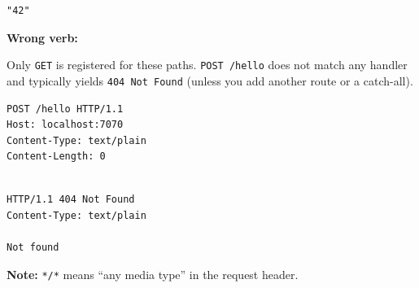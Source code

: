 \begin{solutionorbox}[1.00in]
\begin{httpexchange}
\begin{lstlisting}[style=http]
"42"
\end{lstlisting}
  \end{httpexchange}

  \noindent\textbf{Wrong verb:}\par
  \noindent Only \texttt{GET} is registered for these paths. \texttt{POST /hello} does not match any handler and typically yields \texttt{404 Not Found} (unless you add another route or a catch-all).\par
  \begin{httpexchange}
\begin{lstlisting}[style=http]
POST /hello HTTP/1.1
Host: localhost:7070
Content-Type: text/plain
Content-Length: 0


\end{lstlisting}
\httpmidarrows
\begin{lstlisting}[style=http]
HTTP/1.1 404 Not Found
Content-Type: text/plain

Not found
\end{lstlisting}
  \end{httpexchange}

  \noindent\textbf{Note:}
  \texttt{*/*} means ``any media type'' in the request header.
\end{solutionorbox}


\newpage

